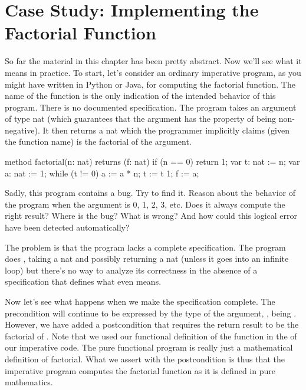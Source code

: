 \documentclass[letterpaper,10pt,english]{sphinxmanual}
\begin{document}
\section{Case Study: Implementing the Factorial Function}
\label{\detokenize{05-putting-it-together:case-study-implementing-the-factorial-function}}
So far the material in this chapter has been pretty abstract. Now
we’ll see what it means in practice. To start, let’s consider an
ordinary imperative program, as you might have written in Python or
Java, for computing the factorial function. The name of the function
is the only indication of the intended behavior of this program. There
is no documented specification. The program takes an argument of type
nat (which guarantees that the argument has the property of being
non-negative). It then returns a nat which the programmer implicitly
claims (given the function name) is the factorial of the argument.

\begin{sphinxVerbatim}[commandchars=\\\{\}]
method factorial(n: nat) returns (f: nat)
\PYGZob{}
    if (n == 0)
    \PYGZob{}
        return 1;
    \PYGZcb{}
    var t: nat := n;
    var a: nat := 1;
    while (t !=  0)
    \PYGZob{}
        a := a * n;
        t := t \PYGZhy{} 1;
    \PYGZcb{}
    f := a;
\PYGZcb{}
\end{sphinxVerbatim}

Sadly, this program contains a bug. Try to find it. Reason about the
behavior of the program when the argument is 0, 1, 2, 3, etc.  Does it
always compute the right result? Where is the bug? What is wrong? And
how could this logical error have been detected automatically?

The problem is that the program lacks a complete specification. The
program does , taking a nat and possibly returning a nat
(unless it goes into an infinite loop) but there’s no way to analyze
its correctness in the absence of a specification that defines what
 even means.

Now let’s see what happens when we make the specification complete.
The precondition will continue to be expressed by the type of the
argument, , being . However, we have added a postcondition
that requires the return result to be the factorial of . Note that
we used our functional definition of the  function in the
 of our imperative code. The pure functional program is
really just a mathematical definition of factorial. What we assert
with the postcondition is thus that the imperative program computes
the factorial function as it is defined in pure mathematics.
\end{document}
